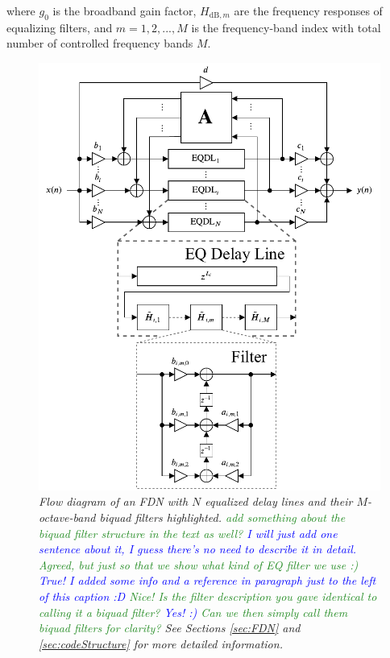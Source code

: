 \documentclass[twoside,a4paper]{article}
\newcommand{\silvin}[1]{\textcolor{ForestGreen}{#1}}
\newcommand{\karolina}[1]{\textcolor{blue}{#1}}
\begin{document}
\noindent where  $g_0$ is the broadband gain factor, $H_{\textrm{dB},m}$ are the frequency responses of equalizing filters, and $m = 1,2,...,M$ is the frequency-band index with total number of controlled frequency bands $M$.



\begin{figure}[t!]

\centering
\includegraphics[width=\columnwidth]{Figures/FDN.pdf}
\caption{\textit{Flow diagram of an FDN with $N$ equalized delay lines and their $M$-octave-band biquad filters highlighted. \silvin{add something about the biquad filter structure in the text as well?} \karolina{I will just add one sentence about it, I guess there's no need to describe it in detail.} \silvin{Agreed, but just so that we show what kind of EQ filter we use :)} \karolina{True! I added some info and a reference in paragraph just to the left of this caption :D} \silvin{Nice! Is the filter description you gave identical to calling it a biquad filter?} \karolina{Yes! :)} \silvin{Can we then simply call them biquad filters for clarity?} See Sections \ref{sec:FDN} and \ref{sec:codeStructure} for more detailed information. }}
\label{fig:diag}
\end{figure}
\end{document}
